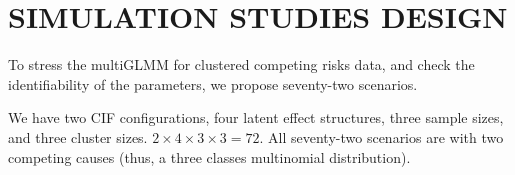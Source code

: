 \section{SIMULATION STUDIES DESIGN}
\label{cap:data}

To stress the multiGLMM for clustered competing risks data, and check
the identifiability of the parameters, we propose seventy-two scenarios.

We have two CIF configurations, four latent effect structures, three
sample sizes, and three cluster sizes. \(2 \times 4 \times 3 \times 3 =
72\). All seventy-two scenarios are with two competing causes (thus, a
three classes multinomial distribution).

